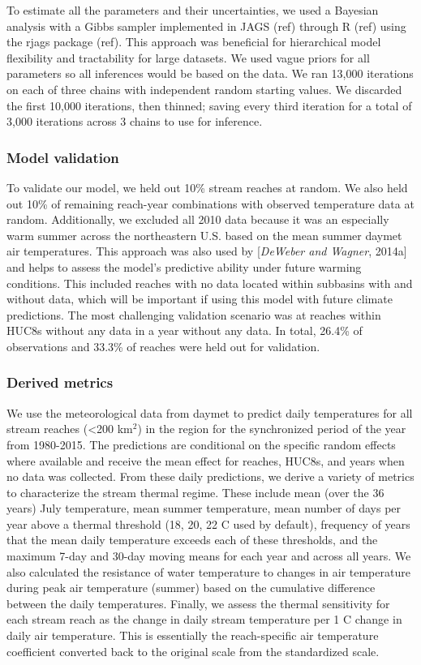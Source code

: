 To estimate all the parameters and their uncertainties, we used a
Bayesian analysis with a Gibbs sampler implemented in JAGS (ref) through
R (ref) using the rjags package (ref). This approach was beneficial for
hierarchical model flexibility and tractability for large datasets. We
used vague priors for all parameters so all inferences would be based on
the data. We ran 13,000 iterations on each of three chains with
independent random starting values. We discarded the first 10,000
iterations, then thinned; saving every third iteration for a total of
3,000 iterations across 3 chains to use for inference.

\subsubsection{Model validation}\label{model-validation}

To validate our model, we held out 10\% stream reaches at random. We
also held out 10\% of remaining reach-year combinations with observed
temperature data at random. Additionally, we excluded all 2010 data
because it was an especially warm summer across the northeastern U.S.
based on the mean summer daymet air temperatures. This approach was also
used by {[}\emph{DeWeber and Wagner}, 2014a{]} and helps to assess the
model's predictive ability under future warming conditions. This
included reaches with no data located within subbasins with and without
data, which will be important if using this model with future climate
predictions. The most challenging validation scenario was at reaches
within HUC8s without any data in a year without any data. In total,
26.4\% of observations and 33.3\% of reaches were held out for
validation.

\subsubsection{Derived metrics}\label{derived-metrics}

We use the meteorological data from daymet to predict daily temperatures
for all stream reaches (\textless{}200 km\(^2\)) in the region for the
synchronized period of the year from 1980-2015. The predictions are
conditional on the specific random effects where available and receive
the mean effect for reaches, HUC8s, and years when no data was
collected. From these daily predictions, we derive a variety of metrics
to characterize the stream thermal regime. These include mean (over the
36 years) July temperature, mean summer temperature, mean number of days
per year above a thermal threshold (18, 20, 22 C used by default),
frequency of years that the mean daily temperature exceeds each of these
thresholds, and the maximum 7-day and 30-day moving means for each year
and across all years. We also calculated the resistance of water
temperature to changes in air temperature during peak air temperature
(summer) based on the cumulative difference between the daily
temperatures. Finally, we assess the thermal sensitivity for each stream
reach as the change in daily stream temperature per 1 C change in daily
air temperature. This is essentially the reach-specific air temperature
coefficient converted back to the original scale from the standardized
scale.

